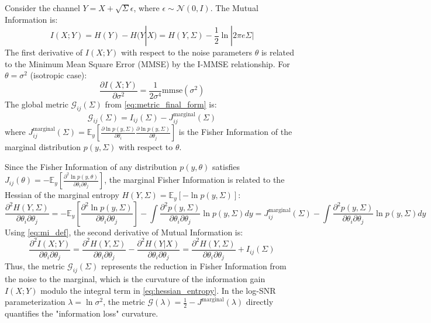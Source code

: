 \documentclass{article}
\begin{document}
Consider the channel $Y = X + \sqrt{\Sigma} \epsilon$, where $\epsilon \sim \mathcal{N}(0, I)$. The Mutual Information is:
\begin{equation} \label{eq:mi_def}
    I(X; Y) = H(Y) - H(Y|X) = H(Y, \Sigma) - \frac{1}{2} \ln |2\pi e \Sigma|
\end{equation}
The first derivative of $I(X; Y)$ with respect to the noise parameters $\theta$ is related to the Minimum Mean Square Error (MMSE) by the I-MMSE relationship. For $\theta = \sigma^2$ (isotropic case):
\begin{equation} \label{eq:i_mmse}
    \frac{\partial I(X; Y)}{\partial \sigma^2} = \frac{1}{2\sigma^4} \text{mmse}(\sigma^2)
\end{equation}
The global metric $\mathcal{G}_{ij}(\Sigma)$ from \eqref{eq:metric_final_form} is:
\begin{equation} \label{eq:metric_vs_marginal_fisher}
    \mathcal{G}_{ij}(\Sigma) = I_{ij}(\Sigma) - J_{ij}^{\text{marginal}}(\Sigma)
\end{equation}
where $J_{ij}^{\text{marginal}}(\Sigma) = \mathbb{E}_y [ \frac{\partial \ln p(y, \Sigma)}{\partial \theta_i} \frac{\partial \ln p(y, \Sigma)}{\partial \theta_j} ]$ is the Fisher Information of the marginal distribution $p(y, \Sigma)$ with respect to $\theta$.

Since the Fisher Information of any distribution $p(y, \theta)$ satisfies $J_{ij}(\theta) = -\mathbb{E}_y [ \frac{\partial^2 \ln p(y, \theta)}{\partial \theta_i \partial \theta_j} ]$, the marginal Fisher Information is related to the Hessian of the marginal entropy $H(Y, \Sigma) = \mathbb{E}_y [ -\ln p(y, \Sigma) ]$:
\begin{equation} \label{eq:hessian_entropy}
    \frac{\partial^2 H(Y, \Sigma)}{\partial \theta_i \partial \theta_j} = -\mathbb{E}_y \left[ \frac{\partial^2 \ln p(y, \Sigma)}{\partial \theta_i \partial \theta_j} \right] - \int \frac{\partial^2 p(y, \Sigma)}{\partial \theta_i \partial \theta_j} \ln p(y, \Sigma) dy = J_{ij}^{\text{marginal}}(\Sigma) - \int \frac{\partial^2 p(y, \Sigma)}{\partial \theta_i \partial \theta_j} \ln p(y, \Sigma) dy
\end{equation}
Using \eqref{eq:mi_def}, the second derivative of Mutual Information is:
\begin{equation} \label{eq:mi_second_deriv}
    \frac{\partial^2 I(X; Y)}{\partial \theta_i \partial \theta_j} = \frac{\partial^2 H(Y, \Sigma)}{\partial \theta_i \partial \theta_j} - \frac{\partial^2 H(Y|X)}{\partial \theta_i \partial \theta_j} = \frac{\partial^2 H(Y, \Sigma)}{\partial \theta_i \partial \theta_j} + I_{ij}(\Sigma)
\end{equation}
Thus, the metric $\mathcal{G}_{ij}(\Sigma)$ represents the reduction in Fisher Information from the noise to the marginal, which is the curvature of the information gain $I(X; Y)$ modulo the integral term in \eqref{eq:hessian_entropy}. In the log-SNR parameterization $\lambda = \ln \sigma^2$, the metric $\mathcal{G}(\lambda) = \frac{1}{2} - J^{\text{marginal}}(\lambda)$ directly quantifies the "information loss" curvature.
\end{document}
